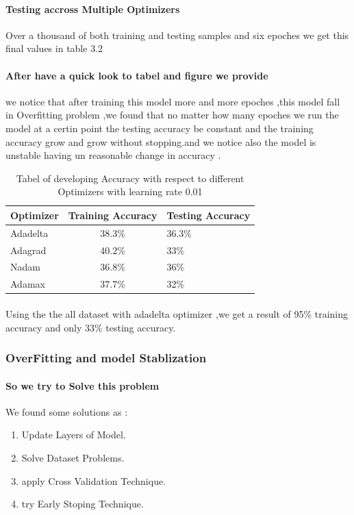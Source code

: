 \paragraph{Testing accross Multiple Optimizers}
Over a thousand of both training and testing samples and six epoches we get this final values in table 3.2

\paragraph{After have a quick look to tabel and figure we provide}
we notice that after training this model more and more epoches ,this model fall in Overfitting problem ,we found that no matter how many epoches we run the model at a certin point the testing accuracy be constant and the training accuracy grow and grow without stopping.and we notice also the model is unstable having un reasonable change in accuracy . 
\begin{table}[h!]
	\begin{center}
		\caption{Tabel of developing Accuracy with respect to different Optimizers with learning rate 0.01 \newline}
		\begin{tabular}{l|c|l}
			\textbf{Optimizer} & \textbf{Training Accuracy} & \textbf{Testing Accuracy}\\ 
			\hline 
			Adadelta & 38.3\% & 36.3\% \\
			Adagrad & 40.2\% & 33\%\\
			Nadam & 36.8\% & 36\% \\
			Adamax & 37.7\% & 32\% \\
		\end{tabular}
	\end{center}
\end{table}
\paragraph{}
Using the the all dataset with adadelta optimizer ,we get a result of 95\% training accuracy and only 33\% testing accuracy.
\subsubsection{OverFitting and model Stablization}
\paragraph{So we try to Solve this problem }
We found some solutions as :
\begin{enumerate}
	\item Update Layers of Model.
	\item Solve Dataset Problems.
	\item apply Cross Validation Technique.
	\item try Early Stoping Technique.
\end{enumerate}
